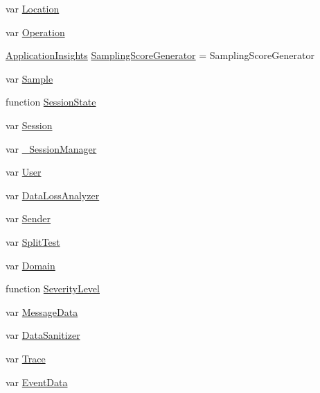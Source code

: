 \begin{DoxyCompactItemize}
\item 
var \hyperlink{_scripts_2ai_80_822_89-build00167_8js_a107c5219a275c2c75548b48049eb29d7}{Location}
\item 
var \hyperlink{_scripts_2ai_80_822_89-build00167_8js_a53ec7a54b2849bab2d97eca342a7bb17}{Operation}
\item 
\hyperlink{_scripts_2ai_80_822_89-build00167_8js_aa415ef4f8cdd699689ef4b61db7656d8}{Application\+Insights} \hyperlink{_scripts_2ai_80_822_89-build00167_8js_a16fa020411e8bfe1c0655b09a399e6cf}{Sampling\+Score\+Generator} = Sampling\+Score\+Generator
\item 
var \hyperlink{_scripts_2ai_80_822_89-build00167_8js_ac4c96e06e96de046ca267f77e98c2cf6}{Sample}
\item 
function \hyperlink{_scripts_2ai_80_822_89-build00167_8js_aed1bddab8f824e41b716e38a2998ff37}{Session\+State}
\item 
var \hyperlink{_scripts_2ai_80_822_89-build00167_8js_adde58525426df76d5d4edaa9c8090a38}{Session}
\item 
var \hyperlink{_scripts_2ai_80_822_89-build00167_8js_ae635f688b4bd69298d993ba9db3c30b2}{\+\_\+\+Session\+Manager}
\item 
var \hyperlink{_scripts_2ai_80_822_89-build00167_8js_a0bf83e41ae2819a20c5b1651d6e492ca}{User}
\item 
var \hyperlink{_scripts_2ai_80_822_89-build00167_8js_a9d4d6587cb1e491c440b1bf2e59d8cf6}{Data\+Loss\+Analyzer}
\item 
var \hyperlink{_scripts_2ai_80_822_89-build00167_8js_aee43c3d63a57bd89c82481442f2e1a40}{Sender}
\item 
var \hyperlink{_scripts_2ai_80_822_89-build00167_8js_a27b27014c3d42240b906d918dc25c813}{Split\+Test}
\item 
var \hyperlink{_scripts_2ai_80_822_89-build00167_8js_a0178ef80afcba95b4ff5882194185f95}{Domain}
\item 
function \hyperlink{_scripts_2ai_80_822_89-build00167_8js_a09d2f6aeadb27dbc0a4d4b8964cba33c}{Severity\+Level}
\item 
var \hyperlink{_scripts_2ai_80_822_89-build00167_8js_af4121513f8b983994459ac94f198e89c}{Message\+Data}
\item 
var \hyperlink{_scripts_2ai_80_822_89-build00167_8js_ac96aeb56be9881f7bbe42dc6a9ab57fe}{Data\+Sanitizer}
\item 
var \hyperlink{_scripts_2ai_80_822_89-build00167_8js_a3867abf13e2de1973401ad4ea465f38d}{Trace}
\item 
var \hyperlink{_scripts_2ai_80_822_89-build00167_8js_a98d9526e051018875c6e50f67c015a42}{Event\+Data}

\end{DoxyCompactItemize}

